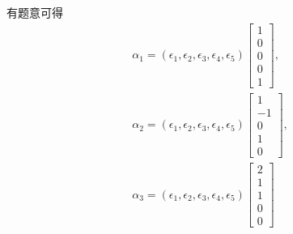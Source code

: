 \documentclass{article}
\begin{document}
有题意可得
\begin{align*}
  \alpha_1 = (\epsilon_1, \epsilon_2, \epsilon_3, \epsilon_4, \epsilon_5)\begin{bmatrix}
                                                                           1 \\
                                                                           0 \\
                                                                           0 \\
                                                                           0 \\
                                                                           1
                                                                         \end{bmatrix}, \\
  \alpha_2 = (\epsilon_1, \epsilon_2, \epsilon_3, \epsilon_4, \epsilon_5)\begin{bmatrix}
                                                                           1  \\
                                                                           -1 \\
                                                                           0  \\
                                                                           1  \\
                                                                           0
                                                                         \end{bmatrix}, \\
  \alpha_3 = (\epsilon_1, \epsilon_2, \epsilon_3, \epsilon_4, \epsilon_5)\begin{bmatrix}
                                                                           2 \\
                                                                           1 \\
                                                                           1 \\
                                                                           0 \\
                                                                           0
                                                                         \end{bmatrix}
\end{align*}
\end{document}
